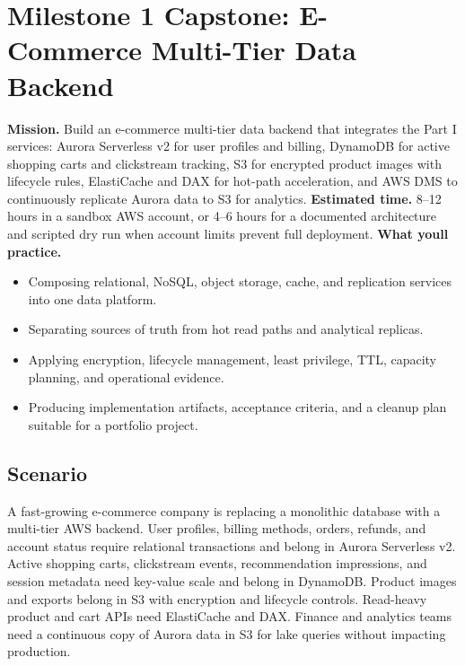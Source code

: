 \section{Milestone 1 Capstone: E-Commerce Multi-Tier Data Backend}\label{sec:ch4-capstone}
\begin{capstonebox}
\textbf{Mission.} Build an e-commerce multi-tier data backend that integrates the Part I services: Aurora Serverless v2 for user profiles and billing, DynamoDB for active shopping carts and clickstream tracking, S3 for encrypted product images with lifecycle rules, ElastiCache and DAX for hot-path acceleration, and AWS DMS to continuously replicate Aurora data to S3 for analytics.
\textbf{Estimated time.} 8--12 hours in a sandbox AWS account, or 4--6 hours for a documented architecture and scripted dry run when account limits prevent full deployment.
\textbf{What you\textquotesingle{}ll practice.}
\begin{itemize}
    \item Composing relational, NoSQL, object storage, cache, and replication services into one data platform.
    \item Separating sources of truth from hot read paths and analytical replicas.
    \item Applying encryption, lifecycle management, least privilege, TTL, capacity planning, and operational evidence.
    \item Producing implementation artifacts, acceptance criteria, and a cleanup plan suitable for a portfolio project.
\end{itemize}
\end{capstonebox}
\subsection*{Scenario}
A fast-growing e-commerce company is replacing a monolithic database with a multi-tier AWS backend. User profiles, billing methods, orders, refunds, and account status require relational transactions and belong in Aurora Serverless v2. Active shopping carts, clickstream events, recommendation impressions, and session metadata need key-value scale and belong in DynamoDB. Product images and exports belong in S3 with encryption and lifecycle controls. Read-heavy product and cart APIs need ElastiCache and DAX. Finance and analytics teams need a continuous copy of Aurora data in S3 for lake queries without impacting production.
